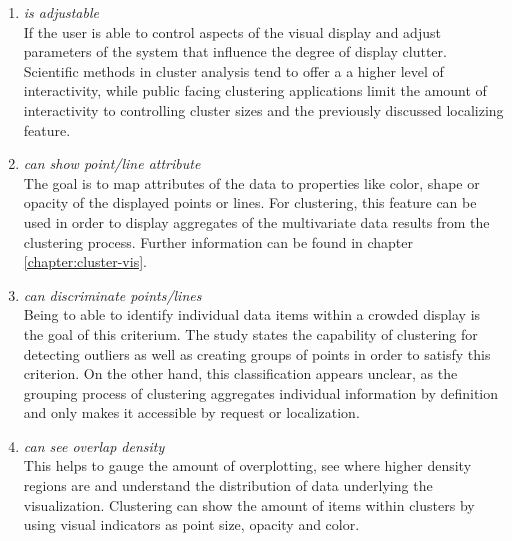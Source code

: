 \begin{enumerate}
\item \textit{is adjustable}
\\ If the user is able to control aspects of the visual display and adjust parameters of the system that influence the degree of display clutter. Scientific methods in cluster analysis tend to offer a a higher level of interactivity, while public facing clustering applications limit the amount of interactivity to controlling cluster sizes and the previously discussed localizing feature. 

\item \textit{can show point/line attribute}
\\ The goal is to map attributes of the data to properties like color, shape or opacity of the displayed points or lines. For clustering, this feature can be used in order to display aggregates of the multivariate data results from the clustering process. Further information can be found in chapter \ref{chapter:cluster-vis}.

\item \textit{can discriminate points/lines}
\\ Being to able to identify individual data items within a crowded display is the goal of this criterium. The study states the capability of clustering for detecting outliers as well as creating groups of points in order to satisfy this criterion. On the other hand, this classification appears unclear, as the grouping process of clustering aggregates individual information by definition and only makes it accessible by request or localization. 

\item \textit{can see overlap density}
\\ This helps to gauge the amount of overplotting, see where higher density regions are and understand the distribution of data underlying the visualization. Clustering can show the amount of items within clusters by using visual indicators as point size, opacity and color.  

\end{enumerate}

